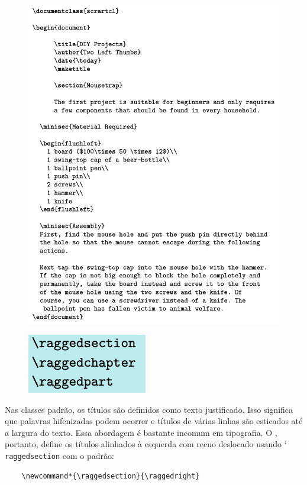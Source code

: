 \begin{figure}
    \centering
    \includegraphics[width=0.9\linewidth]{imagens/imagem21.png}
    \label{fig:img21}
\end{figure}

\begin{figure}
    \centering
    \includegraphics[width=0.3\linewidth]{imagens/imagem22.png}
\end{figure}

Nas classes padrão, os títulos são definidos como texto justificado. Isso significa que palavras hifenizadas podem ocorrer e títulos de várias linhas são esticados até a largura do texto. Essa abordagem é bastante incomum em tipografia. O \KOMAScript, portanto, define os títulos alinhados à esquerda com recuo deslocado usando \char`\\\texttt{ragged\-sec\-tion} com o padrão:
\begin{verbatim}
    \newcommand*{\raggedsection}{\raggedright}
\end{verbatim}

